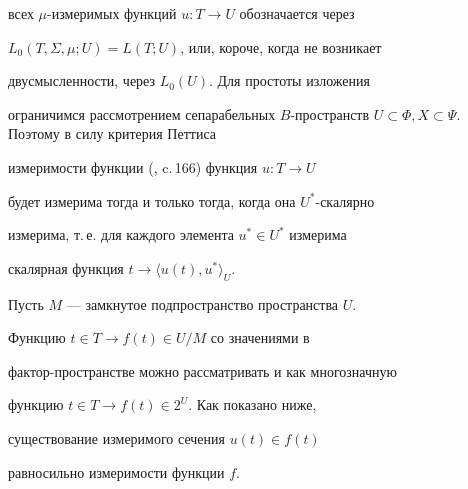 всех $\mu$-измеримых функций $u:T \to U$ обозначается через


$L_0(T, \Sigma, \mu; U)=L(T;U)$, или, короче, когда не возникает


двусмысленности, через $L_0(U)$. Для простоты изложения


ограничимся рассмотрением сепарабельных $B$-пространств $U


\subset \Phi, X \subset \Psi$. Поэтому в силу критерия Петтиса


измеримости функции (\cite{Danford}, c.\,166) функция $u:T \to U$


будет измерима тогда и только тогда, когда она $U^*$-скалярно


измерима, т.\,е. для каждого элемента $u^* \in U^*$ измерима


скалярная функция $t \to {\langle u(t),u^*\rangle}_U$.





Пусть $M$ --- замкнутое подпространство пространства $U$.


Функцию $t \in T \to f(t) \in U/M$ со значениями в


фактор-пространстве можно рассматривать и как многозначную


функцию $t\in T \to f(t) \in 2^U$. Как показано ниже,


существование измеримого сечения $u(t) \in f(t)$


равносильно измеримости функции $f$.






